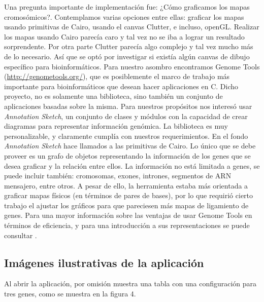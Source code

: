 \documentclass{article}
\begin{document}
	Una pregunta importante de implementación fue: ¿Cómo graficamos los mapas cromosómicos?. Contemplamos varias opciones entre ellas: graficar los mapas usando primitivas de Cairo, usando el canvas Clutter, e incluso, openGL. Realizar los mapas usando Cairo parecía caro y tal vez no se iba a lograr un resultado sorprendente. Por otra parte Clutter parecía algo complejo y tal vez mucho más de lo necesario. Así que se optó por investigar si existía algún canvas de dibujo específico para bioinformáticos. Para nuestro asombro encontramos Genome Tools (\url{http://genometools.org/}), que es posiblemente el marco de trabajo más importante para bioinformáticos que desean hacer aplicaciones en C. Dicho proyecto, no es solamente una biblioteca, sino también un conjunto de aplicaciones basadas sobre la misma. Para nuestros propósitos nos interesó usar \emph{Annotation Sketch}, un conjunto de clases y módulos con la capacidad de crear diagramas para representar información genómica. La biblioteca es muy personalizable, y claramente cumplía con nuestros requerimientos. En el fondo \emph{Annotation Sketch} hace llamados a las primitivas de Cairo. Lo único que se debe proveer es un grafo de objetos representando la información de los genes que se desea graficar y la relación entre ellos. La información no está limitada a genes, se puede incluir también: cromosomas, exones, intrones, segmentos de ARN mensajero, entre otros. A pesar de ello, la herramienta estaba más orientada a graficar mapas físicos (en términos de pares de bases), por lo que requirió cierto trabajo el ajustar los gráficos para que pareciesen más mapas de ligamiento de genes. Para una mayor información sobre las ventajas de usar Genome Tools en términos de eficiencia, y para una introducción a sus representaciones se puede consultar \cite{gremme2013genometools}.
	
	
	
	\subsection{Imágenes ilustrativas de la aplicación}
	
	Al abrir la aplicación, por omisión muestra una tabla con una configuración para tres genes, como se muestra en la figura 4. 
		
\end{document}
